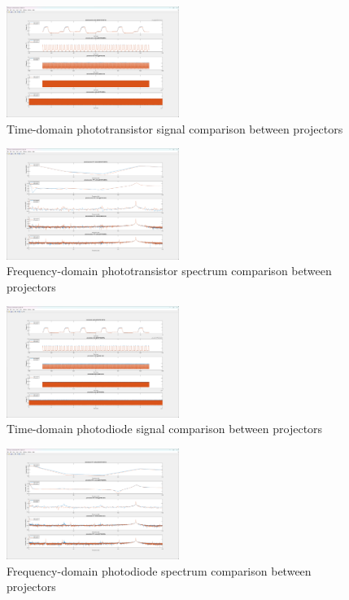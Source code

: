\documentclass[conference]{IEEEtran}
\begin{document}
\begin{figure}[htbp]
	\centerline{\includegraphics[width=0.5\textwidth]{projector-phototransistor-time.png}}
	\caption{Time-domain phototransistor signal comparison between projectors}
	\label{fig:projector-phototransistor-time}
\end{figure}
\begin{figure}[htbp]
	\centerline{\includegraphics[width=0.5\textwidth]{projector-phototransistor-frequency.png}}
	\caption{Frequency-domain phototransistor spectrum comparison between projectors}
	\label{fig:projector-phototransistor-frequency}
\end{figure}
\begin{figure}[htbp]
	\centerline{\includegraphics[width=0.5\textwidth]{projector-photodiode-time.png}}
	\caption{Time-domain photodiode signal comparison between projectors}
	\label{fig:projector-photodiode-time}
\end{figure}
\begin{figure}[htbp]
	\centerline{\includegraphics[width=0.5\textwidth]{projector-photodiode-frequency.png}}
	\caption{Frequency-domain photodiode spectrum comparison between projectors}
	\label{fig:projector-photodiode-frequency}
\end{figure}
\end{document}

